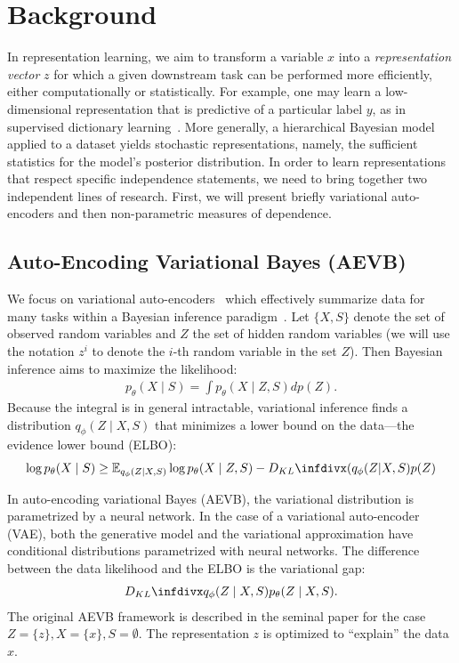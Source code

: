 \section{Background}
\label{hsicbackground}
In representation learning, we aim to transform a variable $x$ into a \emph{representation vector} $z$ for which a given downstream task can be performed more efficiently, either computationally or statistically. For example, one may learn a low-dimensional representation that is predictive of a particular label $y$, as in supervised dictionary learning~\cite{dic_learning}. More generally, a hierarchical Bayesian model~\cite{GelmanHill:2007} applied to a dataset yields stochastic representations, namely, the sufficient statistics for the model's posterior distribution. In order to learn representations that respect specific independence statements, we need to bring together two independent lines of research. First, we will present briefly variational auto-encoders and then non-parametric measures of dependence. 

\subsection{Auto-Encoding Variational Bayes (AEVB)}
We focus on variational auto-encoders~\cite{AEVB} which effectively summarize data for many tasks within a Bayesian inference paradigm~\cite{NIPS2016_6379, Kingma2016}. Let $\{X, S\}$ denote the set of observed random variables and $Z$ the set of hidden random variables (we will use the notation $z^i$ to denote the $i$-th random variable in the set $Z$). Then Bayesian inference aims to maximize the likelihood:
\begin{align}
p_\theta(X \mid S) = \int p_\theta(X \mid Z, S) dp(Z).
\end{align}
Because the integral is in general intractable, variational inference finds a distribution $q_\phi(Z \mid X, S)$ that minimizes a lower bound on the data---the evidence lower bound (ELBO):
\begin{align}
\log p_\theta(X \mid S) \geq \mathbb{E}_{q_\phi(Z \mid X, S)}\log p_\theta(X \mid Z, S) - \kld{(q_\phi(Z|X, S)}{p(Z)}
\end{align}

In auto-encoding variational Bayes (AEVB), the variational distribution is parametrized by a neural network. In the case of a variational auto-encoder (VAE), both the generative model and the variational approximation have  conditional distributions parametrized with neural networks. The difference between the data likelihood and the ELBO is the variational gap:
\begin{align}
	\kld{q_\phi(Z \mid X, S)}{p_\theta(Z \mid X, S)}. 
\end{align}
The original AEVB framework is described in the seminal paper \cite{AEVB} for the case $Z = \{z\}, X = \{x\}, S = \emptyset$. The representation $z$ is optimized to ``explain'' the data $x$. 

